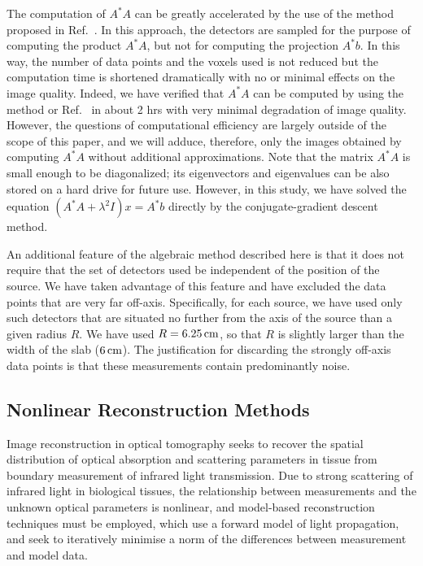 The computation of $A^*A$ can be greatly accelerated by the use of the
method proposed in Ref.~\cite{markel_05_6}. In this approach, the
detectors are sampled for the purpose of computing the product $A^*A$,
but not for computing the projection $A^*b$. In this way, the number
of data points and the voxels used is not reduced but the computation
time is shortened dramatically with no or minimal effects on the image
quality. Indeed, we have verified that $A^*A$ can be computed by using
the method or Ref.~\cite{markel_05_6} in about 2 hrs with very minimal
degradation of image quality. However, the questions of computational
efficiency are largely outside of the scope of this paper, and we will
adduce, therefore, only the images obtained by computing $A^*A$
without additional approximations. Note that the matrix $A^*A$ is
small enough to be diagonalized; its eigenvectors and eigenvalues can
be also stored on a hard drive for future use. However, in this study,
we have solved the equation $(A^*A+\lambda^2I)x=A^*b$ directly by the
conjugate-gradient descent method.

An additional feature of the algebraic method described here is that it does 
not require that the set of detectors used be independent of the position of 
the source. We have taken advantage of this feature and have excluded the 
data points that are very far off-axis. Specifically, for each source, we 
have used only such detectors that are situated no further from the axis of 
the source than a given radius $R$. We have used $R=6.25\,{\rm cm}$, so 
that $R$ is slightly larger than the width of the slab ($6\,{\rm cm}$). 
The justification for discarding the strongly off-axis data points is that 
these measurements contain predominantly noise.




\subsection{Nonlinear Reconstruction Methods}


Image reconstruction in optical tomography seeks to recover the spatial distribution of optical absorption and scattering parameters in tissue from boundary measurement of infrared light transmission. Due to strong scattering of infrared light in biological tissues, the relationship between measurements and the unknown optical parameters is nonlinear, and model-based reconstruction techniques must be employed, which use a forward model of light propagation, and seek to iteratively minimise a norm of the differences between measurement and model data.

